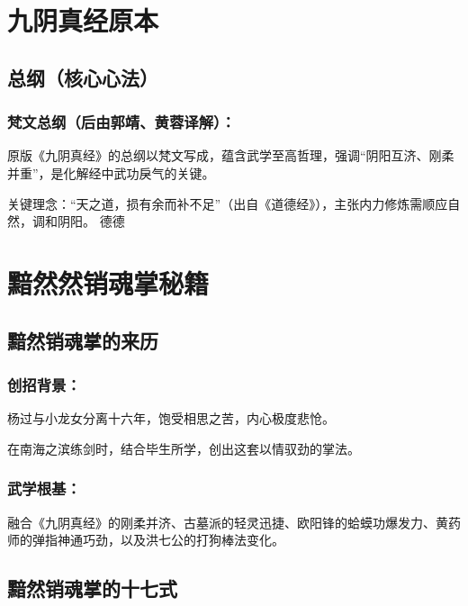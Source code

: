 
\appendix

\chapter{九阴真经原本}

\section{总纲（核心心法）}

\subsection{梵文总纲（后由郭靖、黄蓉译解）：}

原版《九阴真经》的总纲以梵文写成，蕴含武学至高哲理，强调“阴阳互济、刚柔并重”，是化解经中武功戾气的关键。

关键理念：“天之道，损有余而补不足”（出自《道德经》），主张内力修炼需顺应自然，调和阴阳。
 德德

\chapter{黯然然销魂掌秘籍}

\section{黯然销魂掌的来历}

\subsection{创招背景：}

杨过与小龙女分离十六年，饱受相思之苦，内心极度悲怆。

在南海之滨练剑时，结合毕生所学，创出这套以情驭劲的掌法。

\subsection{武学根基：}

融合《九阴真经》的刚柔并济、古墓派的轻灵迅捷、欧阳锋的蛤蟆功爆发力、黄药师的弹指神通巧劲，以及洪七公的打狗棒法变化。

\section{黯然销魂掌的十七式}

